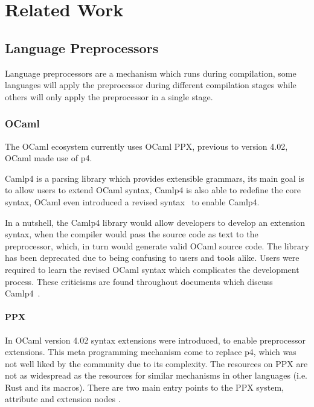 \chapter{Related Work}\label{cha:related-work}

\section{Language Preprocessors}\label{sec:lang-preprocessors}
Language preprocessors are a mechanism which runs during compilation,
some languages will apply the preprocessor during different compilation stages while others will only apply the preprocessor in a single stage.


\subsection{OCaml}\label{sec:lang-preprocessors:ocaml}

The OCaml ecosystem currently uses OCaml \gls{PPX},
previous to version 4.02, OCaml made use of \gls{p4}.

Camlp4 is a parsing library which provides extensible grammars,
its main goal is to allow users to extend OCaml syntax,
Camlp4 is also able to redefine the core syntax,
OCaml even introduced a revised syntax~\autocite{Rauglaudre2003} to enable Camlp4.

In a nutshell, the Camlp4 library would allow developers to develop an extension syntax,
when the compiler would pass the source code as text to the preprocessor,
which, in turn would generate valid OCaml source code.
The library has been deprecated due to being confusing to users and tools alike.
Users were required to learn the revised OCaml syntax which complicates the development process.
These criticisms are found throughout documents which discuss Camlp4~\autocite{Whitequark2014}.

\subsubsection*{PPX}\label{sec:lang-preprocessors:ocaml:ppx}

In OCaml version 4.02 syntax extensions were introduced, to enable preprocessor extensions.
This meta programming mechanism come to replace \gls{p4}, which was not well liked by the community due to its complexity.
The resources on \gls{PPX} are not as widespread as the resources for similar mechanisms in other languages (i.e. Rust and its macros).
There are two main entry points to the PPX system, attribute and extension nodes \autocite[Sections 8.12 \& 8.13]{Leroy2020}.

